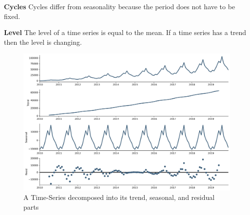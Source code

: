 \textbf{Cycles}
Cycles differ from seasonality because the period does not have to be fixed.


\textbf{Level}
The level of a time series is equal to the mean. If a time series has a trend
then the level is changing.


\begin{figure}[h!]
  \centering
  \caption{A Time-Series decomposed into its trend, seasonal, and residual parts}
  \label{fig:example-time-series-decomposed}
  \includegraphics[width=\textwidth]{./figs/illustrations/time-series_example-decomposed.png}
  \hfill
\end{figure}
